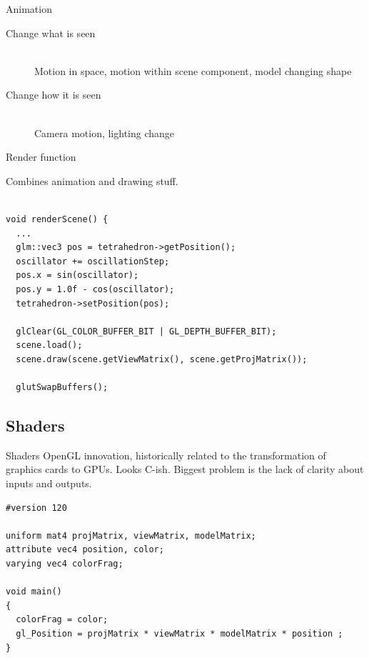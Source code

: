 \documentclass[12pt]{article}
\begin{document}
\begin{frame}{Animation}

\begin{center}
\begin{minipage}{0.75\columnwidth}\raggedright
\begin{description}

\item[Change what is seen] ~~\\
  Motion in space, motion within scene component, model changing shape


\vspace{20pt}

\item[Change how it is seen] ~\\
  Camera motion, lighting change

\end{description}
\end{minipage}
\end{center}

\end{frame}




\begin{frame}[fragile]{Render function}

Combines animation and drawing stuff.

\begin{verbatim}

void renderScene() {
  ...
  glm::vec3 pos = tetrahedron->getPosition();
  oscillator += oscillationStep;
  pos.x = sin(oscillator);
  pos.y = 1.0f - cos(oscillator);
  tetrahedron->setPosition(pos);

  glClear(GL_COLOR_BUFFER_BIT | GL_DEPTH_BUFFER_BIT);
  scene.load();
  scene.draw(scene.getViewMatrix(), scene.getProjMatrix());

  glutSwapBuffers();
\end{verbatim}
\end{frame}


\subsection{Shaders}

\begin{frame}[fragile]{Shaders}
OpenGL innovation, historically related to the transformation of
graphics cards to GPUs.  Looks C-ish.  Biggest problem is the lack of
clarity about inputs and outputs.

\begin{verbatim}
#version 120

uniform mat4 projMatrix, viewMatrix, modelMatrix;
attribute vec4 position, color;
varying vec4 colorFrag;

void main()
{
  colorFrag = color;
  gl_Position = projMatrix * viewMatrix * modelMatrix * position ;
}
\end{verbatim}
\end{frame}
\end{document}
